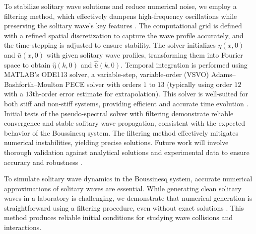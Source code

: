 \documentclass[alpha-refs, 12pt]{wiley-article}
\begin{document}
To stabilize solitary wave solutions and reduce numerical noise, we employ a filtering method, which effectively dampens high-frequency oscillations while preserving the solitary wave's key features \cite{BonaCh, Trefethen2000}. The computational grid is defined with a refined spatial discretization to capture the wave profile accurately, and the time-stepping is adjusted to ensure stability. The solver initializes $\eta(x,0)$ and $\bar{u}(x,0)$ with given solitary wave profiles, transforming them into Fourier space to obtain $\hat{\eta}(k,0)$ and $\hat{\bar{u}}(k,0)$. Temporal integration is performed using MATLAB's ODE113 solver, a variable-step, variable-order (VSVO) Adams--Bashforth--Moulton PECE solver with orders $1$ to $13$ (typically using order $12$ with a $13$th-order error estimate for extrapolation). This solver is well-suited for both stiff and non-stiff systems, providing efficient and accurate time evolution \cite{Boyd2000}. Initial tests of the pseudo-spectral solver with filtering demonstrate reliable convergence and stable solitary wave propagation, consistent with the expected behavior of the Boussinesq system. The filtering method effectively mitigates numerical instabilities, yielding precise solutions. Future work will involve thorough validation against analytical solutions and experimental data to ensure accuracy and robustness \cite{BonaCh,Trefethen2000}.

To simulate solitary wave dynamics in the Boussinesq system, accurate numerical approximations of solitary waves are essential. While generating clean solitary waves in a laboratory is challenging, we demonstrate that numerical generation is straightforward using a filtering procedure, even without exact solutions \cite{BDM2}. This method produces reliable initial conditions for studying wave collisions and interactions.
\end{document}
